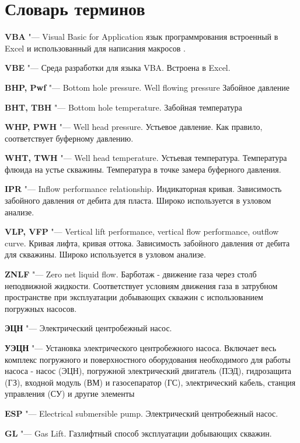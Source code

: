 \chapter*{Словарь терминов}             %

\textbf{VBA} "--- Visual Basic for Application язык программрования встроенный в Excel и использованный для написания макросов \unf.

\textbf{VBE} "--- Среда разработки для языка VBA. Встроена в Excel.

\textbf{BHP, Pwf} "--- Bottom hole pressure. Well flowing pressure Забойное давление

\textbf{BHT, TBH} "--- Bottom hole temperature. Забойная температура

\textbf{WHP, PWH} "--- Well head pressure. Устьевое давление. Как правило, соответствует буферному давлению.

\textbf{WHT, TWH} "--- Well head temperature. Устьевая температура. Температура флюида на устье скважины. Температура в точке замера буферного давления.

\textbf{IPR} "--- Inflow performance relationship. Индикаторная кривая. Зависимость забойного давления от дебита для пласта. Широко используется в узловом анализе.

\textbf{VLP, VFP} "--- Vertical lift performance, vertical flow performance, outflow curve. Кривая лифта, кривая оттока. Зависимость забойного давления от дебита для скважины. Широко используется в узловом анализе.

\textbf{ZNLF} "--- Zero net liquid flow. Барботаж - движение газа через столб неподвижной жидкости. Соответствует условиям движения газа в затрубном пространстве при эксплуатации добывающих скважин с использованием погружных насосов.

\textbf{ЭЦН} "--- Электрический центробежный насос.

\textbf{УЭЦН} "--- Установка электрического центробежного насоса. Включает весь комплекс погружного и поверхностного оборудования необходимого для работы насоса - насос (ЭЦН), погружной электрический двигатель (ПЭД), гидрозащита (ГЗ), входной модуль (ВМ) и газосепаратор (ГС), электрический кабель, станция управления (СУ) и другие элементы

\textbf{ESP} "--- Electrical submersible pump. Электрический центробежный насос.

\textbf{GL} "--- Gas Lift. Газлифтный способ эксплуатации добывающих скважин. 

